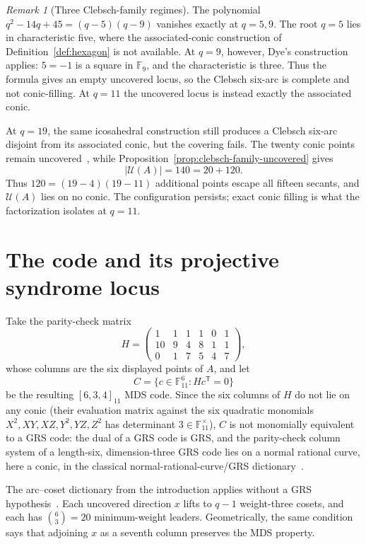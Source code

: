 \documentclass[11pt]{article}
\theoremstyle{definition}
\theoremstyle{remark}
\newtheorem{remark}[theorem]{Remark}
\newcommand{\F}{\mathbb{F}}
\newcommand{\cU}{\mathcal{U}}
\begin{document}
\begin{remark}[Three Clebsch-family regimes]
The polynomial $q^2-14q+45=(q-5)(q-9)$ vanishes exactly at $q=5,9$.
The root $q=5$ lies in characteristic five, where the
associated-conic construction of Definition~\ref{def:hexagon} is
not available. At $q=9$, however, Dye's construction applies:
$5=-1$ is a square in $\F_9$, and the characteristic is three. Thus the
formula gives an empty uncovered locus, so the Clebsch six-arc is complete
and not conic-filling. At $q=11$ the
uncovered locus is instead exactly the associated conic.

At $q=19$, the same icosahedral construction still produces a Clebsch
six-arc disjoint from its associated conic, but the covering fails. The
twenty conic points remain uncovered~\cite[p.~281]{Dye1991}, while
Proposition~\ref{prop:clebsch-family-uncovered} gives
\[
 |\cU(A)|=140=20+120.
\]
Thus $120=(19-4)(19-11)$ additional points escape all fifteen secants, and
$\cU(A)$ lies on no conic. The configuration persists; exact conic filling
is what the factorization isolates at $q=11$.
\end{remark}

\section{The code and its projective syndrome locus}
\label{sec:code}

Take the parity-check matrix
\[
 H=
 \begin{pmatrix}
  1&1&1&1&0&1\\
 10&9&4&8&1&1\\
  0&1&7&5&4&7
 \end{pmatrix},
\]
whose columns are the six displayed points of $A$, and let
\[
 C=\{c\in\F_{11}^6:Hc^{\mathsf T}=0\}
\]
be the resulting $[6,3,4]_{11}$ MDS code. Since the six columns of $H$ do
not lie on any conic (their evaluation matrix against the six quadratic
monomials $X^2,XY,XZ,Y^2,YZ,Z^2$ has determinant
$3\in\F_{11}^{\times}$), $C$ is not monomially
equivalent to a GRS code: the dual of a GRS code is GRS, and the parity-check
column system of a length-six, dimension-three GRS code lies on a normal
rational curve, here a conic, in the classical
normal-rational-curve/GRS dictionary~\cite{StormeThas1991}.

The arc--coset dictionary from the introduction applies without a GRS
hypothesis~\cite[Def.~6.1, Thm.~6.3]{DMP2021}. Each uncovered direction
$x$ lifts to $q-1$ weight-three cosets, and each has
$\binom{6}{3}=20$ minimum-weight leaders. Geometrically, the same condition says
that adjoining $x$ as a seventh column preserves the MDS property.
\end{document}
